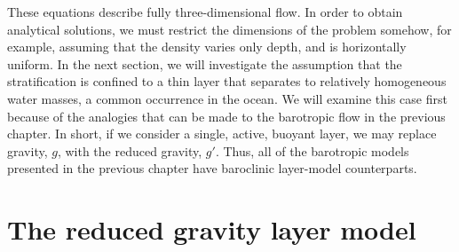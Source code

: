 \documentclass[11pt]{report}
\numberwithin{equation}{section}
\begin{document}
These equations describe fully three-dimensional flow.  In order to obtain analytical solutions, we must restrict the dimensions of the problem somehow, for example, assuming that the density varies only depth, and is horizontally uniform.  In the next section, we will investigate the assumption that the stratification is confined to a thin layer that separates to relatively homogeneous water masses, a common occurrence in the ocean.  We will examine this case first because of the analogies that can be made to the barotropic flow in the previous chapter.  In short, if we consider a single, active, buoyant layer, we may replace gravity, $g$, with the reduced gravity, $g'$.  Thus, all of the barotropic models presented in the previous chapter have baroclinic layer-model counterparts.


\section{The reduced gravity layer model}
\end{document}
